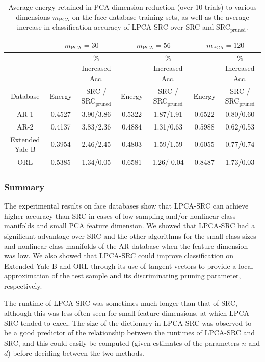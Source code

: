 \documentclass[review]{elsarticle}
\begin{document}
\begin{table}[!htb]
\small{
\centering
\begin{tabular}{|c|c|c|c|c|c|c|}
\hline
& \multicolumn{2}{|c|}{$m_{\mathrm{PCA}} = 30$} & \multicolumn{2}{|c|}{$m_{\mathrm{PCA}} = 56$} & \multicolumn{2}{|c|}{$m_{\mathrm{PCA}} = 120$} \\
\hline
 & 	 & \% Increased Acc. & 	 & \% Increased Acc. & 	 & \% Increased Acc. \\
Database & Energy	 & SRC / SRC$_\mathrm{pruned}$ & Energy & SRC / SRC$_\mathrm{pruned}$ &	Energy & SRC / SRC$_\mathrm{pruned}$ \\
\hline
AR-1	&	0.4527	& 3.90/3.86 &	0.5322	& 1.87/1.91 &	0.6522 & 0.80/0.60	\\
AR-2 	&	0.4137	& 3.83/2.36 &	0.4884	& 1.31/0.63 &	0.5988 & 0.62/0.53	\\
Extended Yale B	&	0.3954	& 2.46/2.45 &	 0.4803 & 1.59/1.59 	&	0.6055 & 0.77/0.74	\\
ORL	&	0.5385	& 1.34/0.05 &	0.6581	& 1.26/-0.04 &	0.8487 & 1.73/0.03	\\
\hline
\end{tabular}
\caption{Average energy retained in PCA dimension reduction (over 10 trials) to various dimensions $m_\mathrm{PCA}$ on the face database training sets, as well as the average increase in classification accuracy of LPCA-SRC over SRC and SRC$_\mathrm{pruned}$. } 
\label{tab:energy}}
\end{table}



\subsubsection{Summary}

The experimental results on face databases show that LPCA-SRC can achieve higher accuracy than SRC in cases of low sampling and/or nonlinear class manifolds and small PCA feature dimension. We showed that LPCA-SRC had a significant advantage over SRC and the other algorithms for the small class sizes and nonlinear class manifolds of the AR database when the feature dimension was low. We also showed that LPCA-SRC could improve classification on Extended Yale B and ORL through its use of tangent vectors to provide a local approximation of the test sample and its discriminating pruning parameter, respectively. 

The runtime of LPCA-SRC was sometimes much longer than that of SRC, although this was less often seen for small feature dimensions, at which LPCA-SRC tended to excel. The size of the dictionary in LPCA-SRC was observed to be a good predictor of the relationship between the runtimes of LPCA-SRC and SRC, and this could easily be computed (given estimates of the parameters $n$ and $d$) before deciding between the two methods.
\end{document}
